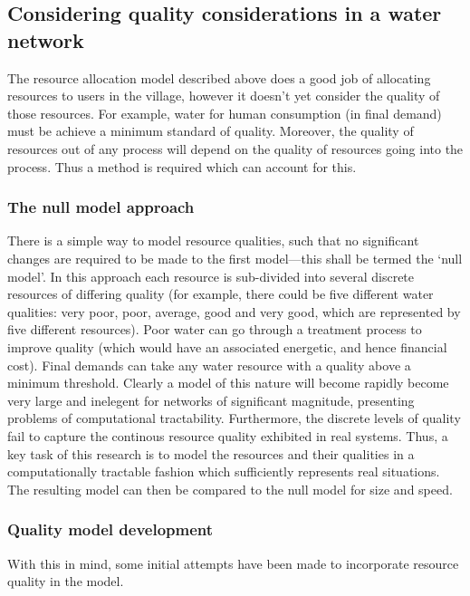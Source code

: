 \subsection{Considering quality considerations in a water network}
The resource allocation model described above does a good job of allocating resources to users in the village, however it doesn't yet consider the quality of those resources. For example, water for human consumption (in final demand) must be achieve a minimum standard of quality. Moreover, the quality of resources out of any process will depend on the quality of resources going into the process. Thus a method is required which can account for this.

\subsubsection*{The null model approach}
There is a simple way to model resource qualities, such that no significant changes are required to be made to the first model---this shall be termed the `null model'. In this approach each resource is sub-divided into several discrete resources of differing quality (for example, there could be five different water qualities: very poor, poor, average, good and very good, which are represented by five different resources). Poor water can go through a treatment process to improve quality (which would have an associated energetic, and hence financial cost). Final demands can take any water resource with a quality above a minimum threshold. Clearly a model of this nature will become rapidly become very large and inelegent for networks of significant magnitude, presenting problems of computational tractability. Furthermore, the discrete levels of quality fail to capture the continous resource quality exhibited in real systems.  Thus, a key task of this research is to model the resources and their qualities in a computationally tractable fashion which sufficiently represents real situations. The resulting model can then be compared to the null model for size and speed.

\subsubsection*{Quality model development}
With this in mind, some initial attempts have been made to incorporate resource quality in the model.
